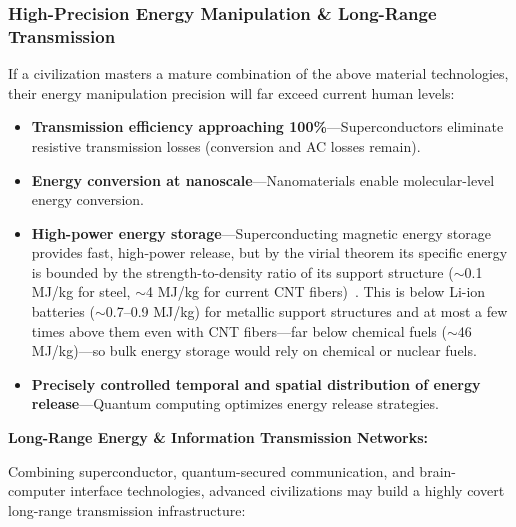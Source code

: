 \documentclass[aps,prd,twocolumn,superscriptaddress,nofootinbib]{revtex4-2}
\begin{document}
\subsubsection{High-Precision Energy Manipulation \& Long-Range Transmission}\label{sec:energy-manipulation}

If a civilization masters a mature combination of the above material technologies, their energy manipulation precision will far exceed current human levels:

\begin{itemize}
  \item \textbf{Transmission efficiency approaching 100\%}---Superconductors eliminate resistive transmission losses (conversion and AC losses remain).
  \item \textbf{Energy conversion at nanoscale}---Nanomaterials enable molecular-level energy conversion.
  \item \textbf{High-power energy storage}---Superconducting magnetic energy storage provides fast, high-power release, but by the virial theorem its specific energy is bounded by the strength-to-density ratio of its support structure (${\sim}$0.1 MJ/kg for steel, ${\sim}$4 MJ/kg for current CNT fibers)~\cite{Moon1982}. This is below Li-ion batteries (${\sim}$0.7--0.9 MJ/kg) for metallic support structures and at most a few times above them even with CNT fibers---far below chemical fuels (${\sim}$46 MJ/kg)---so bulk energy storage would rely on chemical or nuclear fuels.
  \item \textbf{Precisely controlled temporal and spatial distribution of energy release}---Quantum computing optimizes energy release strategies.
\end{itemize}

\textbf{Long-Range Energy \& Information Transmission Networks:}

Combining superconductor, quantum-secured communication, and brain-computer interface technologies, advanced civilizations may build a highly covert long-range transmission infrastructure:
\end{document}
